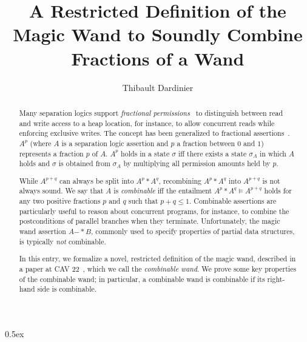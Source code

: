 \documentclass[11pt,a4paper]{article}
\newcommand{\wand}{\ensuremath{\mathbin{-\!\!*}}}
\begin{document}
\title{A Restricted Definition of the Magic Wand to Soundly Combine Fractions of a Wand}
  
\author{Thibault Dardinier}
\maketitle

\begin{abstract}
Many separation logics support \emph{fractional permissions}~\cite{Boyland03} to distinguish between read and write access to a heap location, for instance, to allow concurrent reads while enforcing exclusive writes.
The concept has been generalized to fractional assertions~\cite{Boyland10,JacobsPiessens11,LeHobor18,Brotherston20}. $A^p$ (where $A$ is a separation logic assertion and $p$ a fraction between $0$ and $1$) represents a fraction $p$ of $A$.
$A^p$ holds in a state $\sigma$ iff there exists a state $\sigma_A$ in which $A$ holds and $\sigma$ is obtained from $\sigma_A$ by multiplying all permission amounts held by $p$.

While $A^{p + q}$ can always be split into $A^p * A^q$, recombining $A^p * A^q$ into $A^{p+q}$ is not always sound.
We say that $A$ is \emph{combinable} iff the entailment $A^p * A^q \models A^{p+q}$ holds for any two positive fractions $p$ and $q$ such that $p + q \le 1$.
Combinable assertions are particularly useful to reason about concurrent programs, for instance, to combine the postconditions of parallel branches when they terminate.
Unfortunately, the magic wand assertion $A \wand B$, commonly used to specify properties of partial data structures, is typically \emph{not} combinable.

In this entry, we formalize a novel, restricted definition of the magic wand, described in a paper at CAV 22~\cite{Dardinier22}, which we call the \emph{combinable wand}.
We prove some key properties of the combinable wand; in particular, a combinable wand is combinable if its right-hand side is combinable.
\end{abstract}

\tableofcontents

\parindent 0pt\parskip 0.5ex





\end{document}
